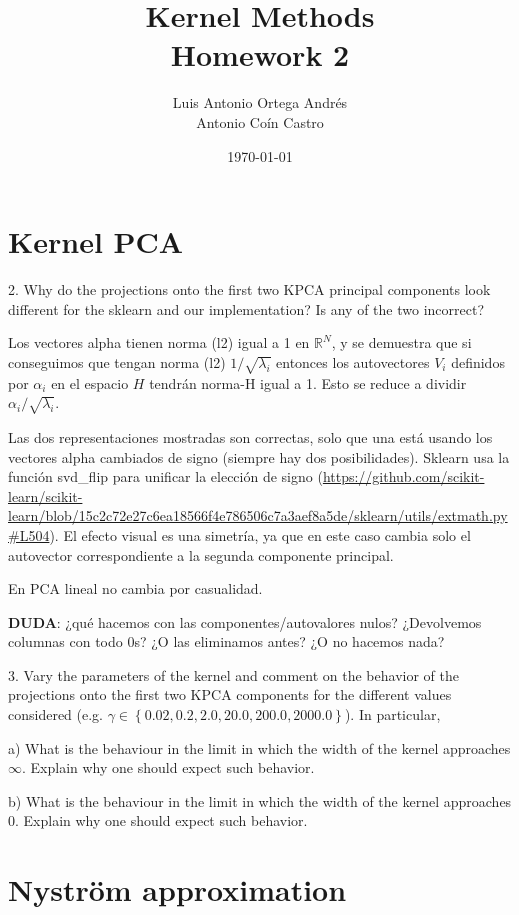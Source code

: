 \documentclass[11pt]{article}
\author{Luis Antonio Ortega Andrés\\Antonio Coín Castro}
\date{\today}
\title{Kernel Methods\\\medskip
\large Homework 2}
\begin{document}
\maketitle

\section{Kernel PCA}

2. Why do the projections onto the first two KPCA principal components look different for the sklearn and our implementation? Is any of the two incorrect?

Los vectores alpha tienen norma (l2) igual a 1 en $\mathbb R^N$, y se demuestra que si conseguimos que tengan norma (l2) $1/\sqrt{\lambda_i}$ entonces los autovectores $V_i$ definidos por $\alpha_i$ en el espacio $H$ tendrán norma-H igual a 1. Esto se reduce a dividir $\alpha_i/\sqrt{\lambda_i}$.

Las dos representaciones mostradas son correctas, solo que una está usando los vectores alpha cambiados de signo (siempre hay dos posibilidades). Sklearn usa la función svd\_flip para unificar la elección de signo (\url{https://github.com/scikit-learn/scikit-learn/blob/15c2c72e27c6ea18566f4e786506c7a3aef8a5de/sklearn/utils/extmath.py#L504}). El efecto visual es una simetría, ya que en este caso cambia solo el autovector correspondiente a la segunda componente principal.

En PCA lineal no cambia por casualidad.

\textbf{DUDA}: ¿qué hacemos con las componentes/autovalores nulos? ¿Devolvemos columnas con todo 0s? ¿O las eliminamos antes? ¿O no hacemos nada?

3. Vary the parameters of the kernel and comment on the behavior of the projections onto the first two KPCA components for the different values considered (e.g. $\gamma \in \left\{0.02, 0.2, 2.0, 20.0, 200.0, 2000.0\right\}$). In particular,

    a) What is the behaviour in the limit in which the width of the kernel approaches $\infty$. Explain why one should expect such behavior.

    b) What is the behaviour in the limit in which the width of the kernel approaches $0$. Explain why one should expect such behavior.

\section{Nyström approximation}
\end{document}
